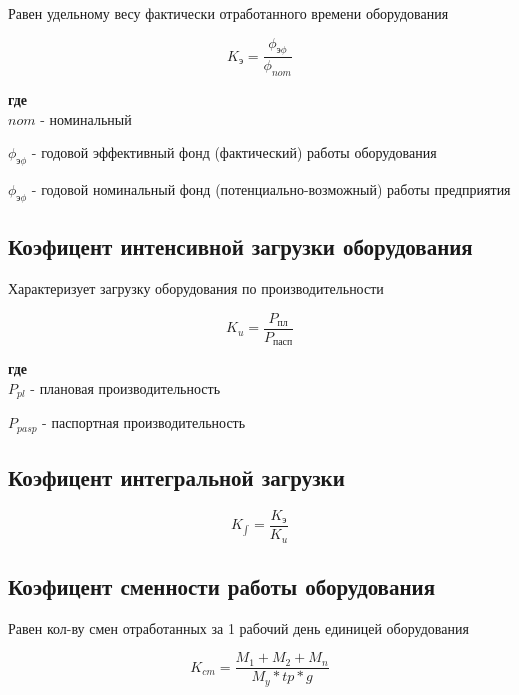 \documentclass[11pt]{article}
\begin{document}
Равен удельному весу фактически отработанного времени оборудования

\begin{equation}
  K_{\text{э}} = \frac{\phi_{\text{э}\phi}}{\phi_{nom}}
\end{equation}

\textbf{где} \\

\(nom\) - номинальный


\(\phi_{\text{э}\phi}\) - годовой эффективный фонд (фактический) работы оборудования


\(\phi_{\text{э}\phi}\) - годовой номинальный фонд (потенциально-возможный) работы предприятия


\subsection{Коэфицент интенсивной загрузки оборудования}
\label{sec:orge353a74}

Характеризует загрузку оборудования по производительности

\begin{equation}
  K_{u} = \frac{P_{\text{пл}}}{P_{\text{пасп}}}
\end{equation}

\textbf{где} \\

\({P_{pl}}\) - плановая производительность

\({P_{pasp}}\) - паспортная производительность

\subsection{Коэфицент интегральной загрузки}
\label{sec:org2994e8e}

\begin{equation}
  K_{\int} = \frac{K_{\text{э}}}{K_{u}}
\end{equation}

\subsection{Коэфицент сменности работы оборудования}
\label{sec:orga8c24f6}

Равен кол-ву смен отработанных за 1 рабочий день единицей оборудования

\begin{equation}
  K_{cm} = \frac{M_{1} + M_{2} + M_{n}}{M_{y}*tp*g}
\end{equation}
\end{document}
